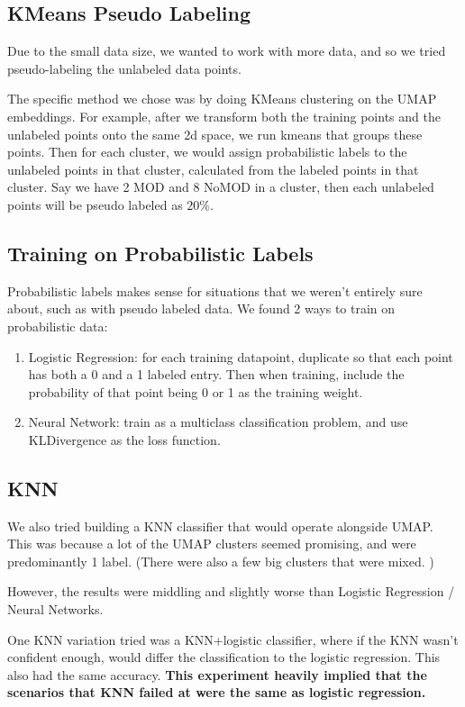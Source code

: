 \documentclass[12pt]{article}
\theoremstyle{definition}
\begin{document}
\subsection{KMeans Pseudo Labeling}
Due to the small data size, we wanted to work with more data, and so we tried pseudo-labeling the unlabeled data points. 

The specific method we chose was by doing KMeans clustering on the UMAP embeddings. For example, after we transform both the training points and the unlabeled points onto the same 2d space, we run kmeans that groups these points. Then for each cluster, we would assign probabilistic labels to the unlabeled points in that cluster, calculated from the labeled points in that cluster. Say we have 2 MOD and 8 NoMOD in a cluster, then each unlabeled points will be pseudo labeled as $20\%$.

\subsection{Training on Probabilistic Labels}
Probabilistic labels makes sense for situations that we weren't entirely sure about, such as with pseudo labeled data. We found 2 ways to train on probabilistic data: 
\begin{enumerate}
    \item Logistic Regression: for each training datapoint, duplicate so that each point has both a 0 and a 1 labeled entry. Then when training, include the probability of that point being 0 or 1 as the training weight.
    \item Neural Network: train as a multiclass classification problem, and use KLDivergence as the loss function.
\end{enumerate}


\subsection{KNN}
We also tried building a KNN classifier that would operate alongside UMAP. This was because a lot of the UMAP clusters seemed promising, and were predominantly 1 label. (There were also a few big clusters that were mixed. )

However, the results were middling and slightly worse than Logistic Regression / Neural Networks. 

One KNN variation tried was a KNN+logistic classifier, where if the KNN wasn't confident enough, would differ the classification to the logistic regression. This also had the same accuracy. \textbf{This experiment heavily implied that the scenarios that KNN failed at were the same as logistic regression. }
\end{document}
